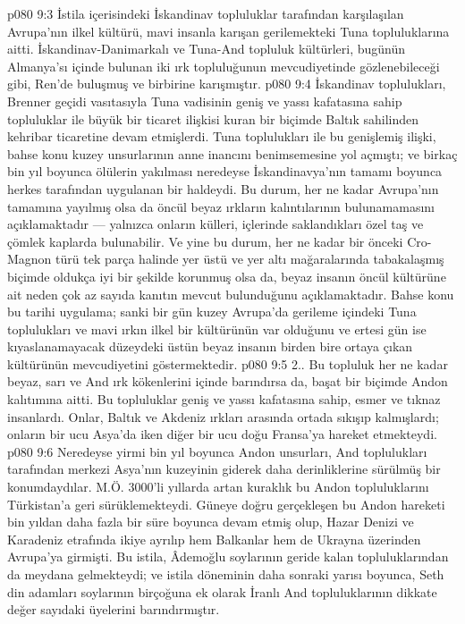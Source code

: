 \vs p080 9:3 İstila içerisindeki İskandinav topluluklar tarafından karşılaşılan Avrupa’nın ilkel kültürü, mavi insanla karışan gerilemekteki Tuna topluluklarına aitti. İskandinav\hyp{}Danimarkalı ve Tuna\hyp{}And topluluk kültürleri, bugünün Almanya’sı içinde bulunan iki ırk topluluğunun mevcudiyetinde gözlenebileceği gibi, Ren’de buluşmuş ve birbirine karışmıştır.
\vs p080 9:4 İskandinav toplulukları, Brenner geçidi vasıtasıyla Tuna vadisinin geniş ve yassı kafatasına sahip topluluklar ile büyük bir ticaret ilişkisi kuran bir biçimde Baltık sahilinden kehribar ticaretine devam etmişlerdi. Tuna toplulukları ile bu genişlemiş ilişki, bahse konu kuzey unsurlarının anne inancını benimsemesine yol açmıştı; ve birkaç bin yıl boyunca ölülerin yakılması neredeyse İskandinavya’nın tamamı boyunca herkes tarafından uygulanan bir haldeydi. Bu durum, her ne kadar Avrupa’nın tamamına yayılmış olsa da öncül beyaz ırkların kalıntılarının bulunamamasını açıklamaktadır --- yalnızca onların külleri, içlerinde saklandıkları özel taş ve çömlek kaplarda bulunabilir. Ve yine bu durum, her ne kadar bir önceki Cro\hyp{}Magnon türü tek parça halinde yer üstü ve yer altı mağaralarında tabakalaşmış biçimde oldukça iyi bir şekilde korunmuş olsa da, beyaz insanın öncül kültürüne ait neden çok az sayıda kanıtın mevcut bulunduğunu açıklamaktadır. Bahse konu bu tarihi uygulama; sanki bir gün kuzey Avrupa’da gerileme içindeki Tuna toplulukları ve mavi ırkın ilkel bir kültürünün var olduğunu ve ertesi gün ise kıyaslanamayacak düzeydeki üstün beyaz insanın birden bire ortaya çıkan kültürünün mevcudiyetini göstermektedir.
\vs p080 9:5 2.. Bu topluluk her ne kadar beyaz, sarı ve And ırk kökenlerini içinde barındırsa da, başat bir biçimde Andon kalıtımına aitti. Bu topluluklar geniş ve yassı kafatasına sahip, esmer ve tıknaz insanlardı. Onlar, Baltık ve Akdeniz ırkları arasında ortada sıkışıp kalmışlardı; onların bir ucu Asya’da iken diğer bir ucu doğu Fransa’ya hareket etmekteydi.
\vs p080 9:6 Neredeyse yirmi bin yıl boyunca Andon unsurları, And toplulukları tarafından merkezi Asya’nın kuzeyinin giderek daha derinliklerine sürülmüş bir konumdaydılar. M.Ö. 3000’li yıllarda artan kuraklık bu Andon topluluklarını Türkistan’a geri sürüklemekteydi. Güneye doğru gerçekleşen bu Andon hareketi bin yıldan daha fazla bir süre boyunca devam etmiş olup, Hazar Denizi ve Karadeniz etrafında ikiye ayrılıp hem Balkanlar hem de Ukrayna üzerinden Avrupa’ya girmişti. Bu istila, Âdemoğlu soylarının geride kalan topluluklarından da meydana gelmekteydi; ve istila döneminin daha sonraki yarısı boyunca, Seth din adamları soylarının birçoğuna ek olarak İranlı And topluluklarının dikkate değer sayıdaki üyelerini barındırmıştır.
